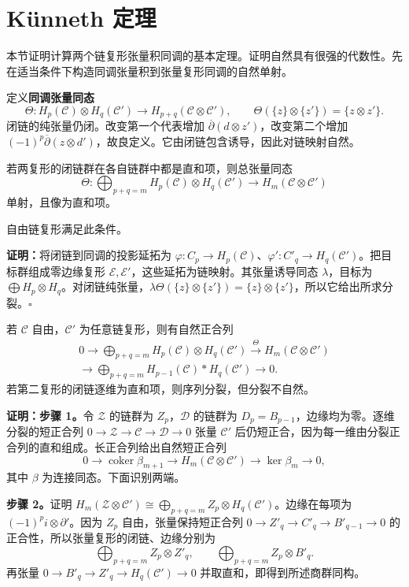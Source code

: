 \section{Künneth 定理}
本节证明计算两个链复形张量积同调的基本定理。证明自然具有很强的代数性。先在适当条件下构造同调张量积到张量复形同调的自然单射。

定义\textbf{同调张量同态}
\[
\Theta:H_p(\mathcal C)\otimes H_q(\mathcal C')\to H_{p+q}(\mathcal C\otimes\mathcal C'),\qquad
\Theta(\{z\}\otimes\{z'\})=\{z\otimes z'\}.
\]
闭链的纯张量仍闭。改变第一个代表增加 $\overline\partial(d\otimes z')$，改变第二个增加 $(-1)^p\overline\partial(z\otimes d')$，故良定义。它由闭链包含诱导，因此对链映射自然。

若两复形的闭链群在各自链群中都是直和项，则总张量同态
\[
\Theta:\bigoplus_{p+q=m}H_p(\mathcal C)\otimes H_q(\mathcal C')\to H_m(\mathcal C\otimes\mathcal C')
\]
单射，且像为直和项。

自由链复形满足此条件。

\textbf{证明：}将闭链到同调的投影延拓为 $\varphi:C_p\to H_p(\mathcal C)$、$\varphi':C'_q\to H_q(\mathcal C')$。把目标群组成零边缘复形 $\mathcal E,\mathcal E'$，这些延拓为链映射。其张量诱导同态 $\lambda$，目标为 $\bigoplus H_p\otimes H_q$。对闭链纯张量，$\lambda\Theta(\{z\}\otimes\{z'\})=\{z\}\otimes\{z'\}$，所以它给出所求分裂。\hfill$\square$

若 $\mathcal C$ 自由，$\mathcal C'$ 为任意链复形，则有自然正合列
\[
\begin{split}
0\to\bigoplus_{p+q=m}H_p(\mathcal C)\otimes H_q(\mathcal C')
\xrightarrow{\Theta}H_m(\mathcal C\otimes\mathcal C')\\
\to\bigoplus_{p+q=m}H_{p-1}(\mathcal C)*H_q(\mathcal C')\to0.
\end{split}
\]
若第二复形的闭链逐维为直和项，则序列分裂，但分裂不自然。

\textbf{证明：步骤 1。}令 $\mathcal Z$ 的链群为 $Z_p$，$\mathcal D$ 的链群为 $D_p=B_{p-1}$，边缘均为零。逐维分裂的短正合列 $0\to\mathcal Z\to\mathcal C\to\mathcal D\to0$ 张量 $\mathcal C'$ 后仍短正合，因为每一维由分裂正合列的直和组成。长正合列给出自然短正合列
\[
0\to\operatorname{coker}\beta_{m+1}\to H_m(\mathcal C\otimes\mathcal C')\to\ker\beta_m\to0,
\]
其中 $\beta$ 为连接同态。下面识别两端。

\textbf{步骤 2。}证明 $H_m(\mathcal Z\otimes\mathcal C')\cong\bigoplus_{p+q=m}Z_p\otimes H_q(\mathcal C')$。边缘在每项为 $(-1)^pi\otimes\partial'$。因为 $Z_p$ 自由，张量保持短正合列 $0\to Z'_q\to C'_q\to B'_{q-1}\to0$ 的正合性，所以张量复形的闭链、边缘分别为
\[
\bigoplus_{p+q=m}Z_p\otimes Z'_q,\qquad\bigoplus_{p+q=m}Z_p\otimes B'_q.
\]
再张量 $0\to B'_q\to Z'_q\to H_q(\mathcal C')\to0$ 并取直和，即得到所述商群同构。


